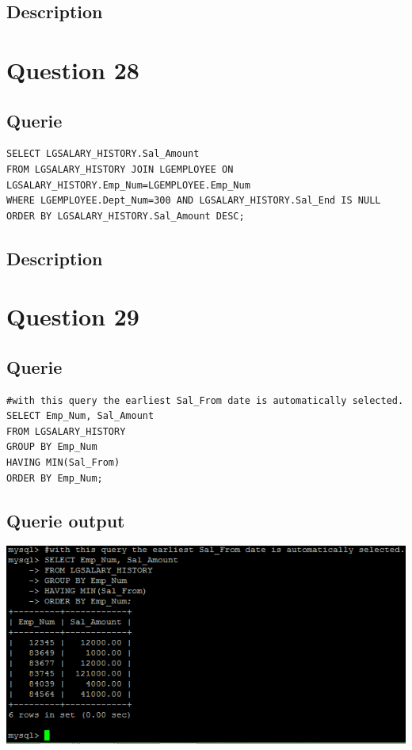 \documentclass[a4paper,10pt]{article}
\begin{document}
\subsection{Description}\section*{Question 28}
 \subsection{Querie}
          \lstset{
            language=SQL,
            breaklines=true
            }
        \begin{lstlisting}[frame=single]
        SELECT LGSALARY_HISTORY.Sal_Amount
FROM LGSALARY_HISTORY JOIN LGEMPLOYEE ON LGSALARY_HISTORY.Emp_Num=LGEMPLOYEE.Emp_Num
WHERE LGEMPLOYEE.Dept_Num=300 AND LGSALARY_HISTORY.Sal_End IS NULL
ORDER BY LGSALARY_HISTORY.Sal_Amount DESC;

        \end{lstlisting}
\subsection{Description}\section*{Question 29}
 \subsection{Querie}
          \lstset{
            language=SQL,
            breaklines=true
            }
        \begin{lstlisting}[frame=single]
        #with this query the earliest Sal_From date is automatically selected.
SELECT Emp_Num, Sal_Amount
FROM LGSALARY_HISTORY
GROUP BY Emp_Num
HAVING MIN(Sal_From)
ORDER BY Emp_Num;

        \end{lstlisting}
\subsection{Querie output}
           \includegraphics{Queries/Question_29/Question_29_screenshot.PNG}
\end{document}
